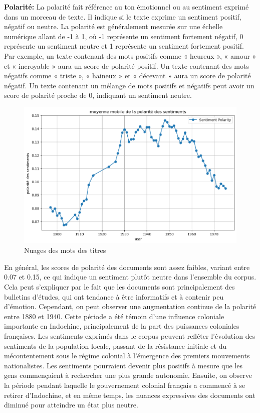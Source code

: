 \textbf{Polarité:} La polarité fait référence au ton émotionnel ou au sentiment exprimé dans un morceau de texte. Il indique si le texte exprime un sentiment positif, négatif ou neutre.  La polarité est généralement mesurée sur une échelle numérique allant de -1 à 1, où  -1 représente un sentiment fortement négatif, 0 représente un sentiment neutre et 1 représente un sentiment fortement positif. Par exemple, un texte contenant des mots positifs comme « heureux », « amour » et « incroyable » aura un score de polarité positif. Un texte contenant des mots négatifs comme « triste », « haineux » et « décevant » aura un score de polarité négatif. Un texte contenant un mélange de mots positifs et négatifs peut avoir un score de polarité proche de 0, indiquant un sentiment neutre.

\begin{figure}[!ht]
    \centering
    \includegraphics[width=12cm]{img/2.8.polarity_sentiment.png}
    \caption{Nuages des mots des titres}
    \label{fig:polar_senti}
\end{figure}

En général, les scores de polarité des documents sont assez faibles, variant entre 0.07 et 0.15, ce qui indique un sentiment plutôt neutre dans l'ensemble du corpus. Cela peut s'expliquer par le fait que les documents sont principalement des bulletins d'études, qui ont tendance à être informatifs et à contenir peu d'émotion. Cependant, on peut observer une augmentation continue de la polarité entre 1880 et 1940. Cette période a été témoin d'une influence coloniale importante en Indochine, principalement de la part des puissances coloniales françaises. Les sentiments exprimés dans le corpus peuvent refléter l'évolution des sentiments de la population locale, passant de la résistance initiale et du mécontentement sous le régime colonial à l'émergence des premiers mouvements nationalistes. Les sentiments pourraient devenir plus positifs à mesure que les gens commençaient à rechercher une plus grande autonomie. Ensuite, on observe la période pendant laquelle le gouvernement colonial français a commencé à se retirer d'Indochine, et en même temps, les nuances expressives des documents ont diminué pour atteindre un état plus neutre.

